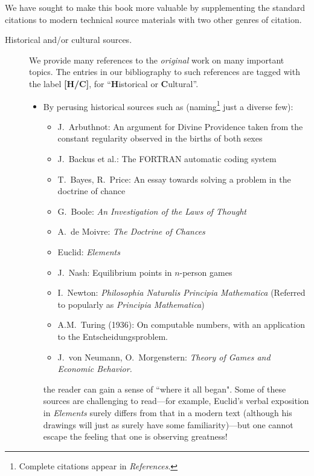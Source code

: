 \noindent
We have sought to make this book more valuable by supplementing the standard citations to modern technical source materials with two other genres of citation.
\begin{description}
\item[{\sc Historical and/or cultural sources}.]
We provide many references to the {\em original} work on many important topics.  The entries in our bibliography to such references are tagged with the label {\bf [H/C]}, for ``{\bf H}istorical or {\bf C}ultural''.
  \begin{itemize}
  \item
By perusing historical sources such as (naming\footnote{Complete citations appear in {\it References}.} just a diverse few): 

\medskip

     \begin{itemize}
     \item
J.~Arbuthnot: An argument for Divine Providence taken from the constant regularity observed in the births of both sexes
     \medskip\item
J.~Backus et al.: The FORTRAN automatic coding system
      \medskip\item
T.~Bayes, R.~Price: An essay towards solving a problem in the doctrine of chance
      \medskip\item
G.~Boole: {\it An Investigation of the Laws of Thought}   
     \medskip\item
A.~de Moivre: {\it The Doctrine of Chances}
     \medskip\item
Euclid: {\it Elements} 
    \medskip\item
J.~Nash: Equilibrium points in $n$-person games
    \medskip\item
I.~Newton: {\it Philosophia Naturalis Principia Mathematica}
(Referred to popularly as {\it Principia Mathematica})
    \medskip\item
A.M.~Turing (1936): On computable numbers, with an application to the Entscheidungsproblem.
    \medskip\item
J.~von Neumann, O.~Morgenstern: {\it Theory of Games and Economic Behavior.}
    \end{itemize}
the reader can gain a sense of ``where it all began".  Some of these sources are challenging to read---for example, Euclid's verbal exposition in {\it Elements} surely differs from that in a modern text (although his drawings will just as surely have some familiarity)---but one cannot escape the feeling that one is observing greatness!


\end{itemize}
\end{description}
